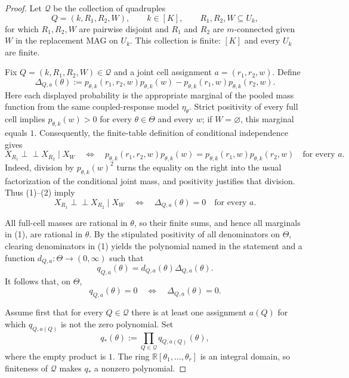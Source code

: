 \documentclass{article}
\begin{document}
\begin{proof}
Let \(\mathcal Q\) be the collection of quadruples
\[
 Q=(k,R_1,R_2,W),
 \qquad k\in[K],
 \qquad R_1,R_2,W\subseteq U_k,
\]
for which \(R_1,R_2,W\) are pairwise disjoint and \(R_1\) and \(R_2\) are \(m\)-connected given \(W\) in the replacement MAG on \(U_k\).  This collection is finite: \([K]\) and every \(U_k\) are finite.

Fix \(Q=(k,R_1,R_2,W)\in\mathcal Q\) and a joint cell assignment \(a=(r_1,r_2,w)\).  Define
\[
 \Delta_{Q,a}(\theta)
 :=p_{\theta,k}(r_1,r_2,w)p_{\theta,k}(w)
   -p_{\theta,k}(r_1,w)p_{\theta,k}(r_2,w).
 \tag{1}
\]
Here each displayed probability is the appropriate marginal of the pooled mass function from the same coupled-response model \(\eta_\theta\).  Strict positivity of every full cell implies \(p_{\theta,k}(w)>0\) for every \(\theta\in\Theta\) and every \(w\); if \(W=\varnothing\), this marginal equals \(1\).  Consequently, the finite-table definition of conditional independence gives
\[
 X_{R_1}\mathbin{\perp\!\!\!\perp}X_{R_2}\mid X_W
 \quad\Longleftrightarrow\quad
 p_{\theta,k}(r_1,r_2,w)p_{\theta,k}(w)
 =p_{\theta,k}(r_1,w)p_{\theta,k}(r_2,w)
 \quad\text{for every }a.
 \tag{2}
\]
Indeed, division by \(p_{\theta,k}(w)^2\) turns the equality on the right into the usual factorization of the conditional joint mass, and positivity justifies that division.  Thus (1)--(2) imply
\[
 X_{R_1}\mathbin{\perp\!\!\!\perp}X_{R_2}\mid X_W
 \quad\Longleftrightarrow\quad
 \Delta_{Q,a}(\theta)=0\quad\text{for every }a.
 \tag{3}
\]

All full-cell masses are rational in \(\theta\), so their finite sums, and hence all marginals in (1), are rational in \(\theta\).  By the stipulated positivity of all denominators on \(\Theta\), clearing denominators in (1) yields the polynomial named in the statement and a function \(d_{Q,a}:\Theta\to(0,\infty)\) such that
\[
 q_{Q,a}(\theta)=d_{Q,a}(\theta)\Delta_{Q,a}(\theta).
 \tag{4}
\]
It follows that, on \(\Theta\),
\[
 q_{Q,a}(\theta)=0
 \quad\Longleftrightarrow\quad
 \Delta_{Q,a}(\theta)=0.
 \tag{5}
\]

Assume first that for every \(Q\in\mathcal Q\) there is at least one assignment \(a(Q)\) for which \(q_{Q,a(Q)}\) is not the zero polynomial.  Set
\[
 q_*(\theta):=\prod_{Q\in\mathcal Q}q_{Q,a(Q)}(\theta),
 \tag{6}
\]
where the empty product is \(1\).  The ring \(\mathbb R[\theta_1,\ldots,\theta_r]\) is an integral domain, so finiteness of \(\mathcal Q\) makes \(q_*\) a nonzero polynomial.


\end{proof}
\end{document}
